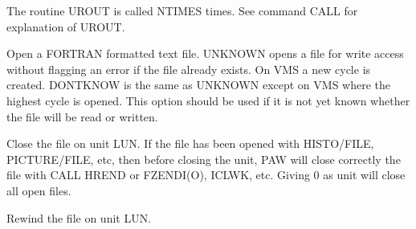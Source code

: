 
\BEGARG
{}
\ENDARG

   \par
The routine UROUT is called NTIMES times.  See command CALL for explanation 
   of UROUT.  

\ENDCMD


\BEGARG
{}
\ENDARG
{}
\ENDOPT

   \par
Open a FORTRAN formatted text file.  UNKNOWN opens a file for write access 
   without flagging an error if the file already exists.  On VMS a new cycle 
   is created.  DONTKNOW is the same as UNKNOWN except on VMS where the 
   highest cycle is opened.  This option should be used if it is not yet known 
   whether the file will be read or written.  

\ENDCMD


\BEGARG
{}
\ENDARG

   \par
Close the file on unit LUN.  If the file has been opened with HISTO/FILE, 
   PICTURE/FILE, etc, then before closing the unit, PAW will close correctly 
   the file with CALL HREND or FZENDI(O), ICLWK, etc.  Giving 0 as unit will 
   close all open files.  

\ENDCMD


\BEGARG
{}
\ENDARG

   \par
Rewind the file on unit LUN.  

